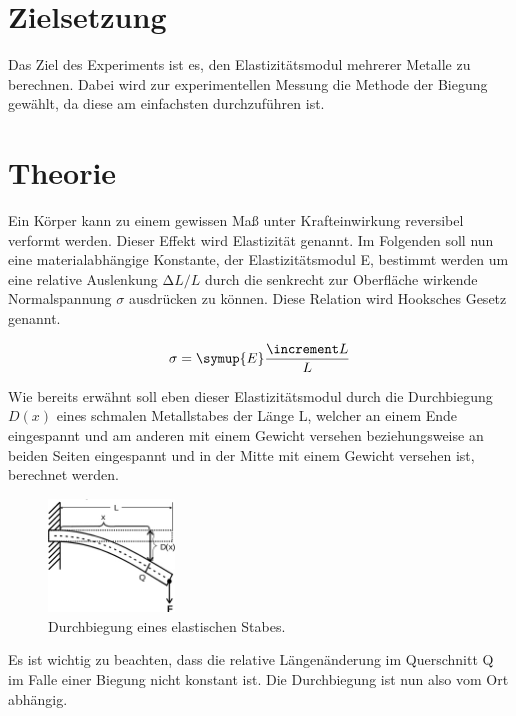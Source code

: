 \section{Zielsetzung}
\label{sec:Zielsetzung}

Das Ziel des Experiments ist es, den Elastizitätsmodul mehrerer Metalle zu berechnen.
Dabei wird zur experimentellen Messung die Methode der Biegung gewählt, da diese am einfachsten durchzuführen ist.

\section{Theorie}
\label{sec:Theorie}

Ein Körper kann zu einem gewissen Maß unter Krafteinwirkung reversibel
verformt werden. Dieser Effekt wird Elastizität genannt. Im Folgenden soll nun
eine materialabhängige Konstante, der Elastizitätsmodul E, bestimmt werden
um eine relative Auslenkung $\increment L/L$ durch die senkrecht zur Oberfläche
wirkende Normalspannung $\sigma$ ausdrücken zu können. Diese Relation wird
Hooksches Gesetz genannt.

\begin{equation}
  \sigma = \symup{E}\frac{\increment L}{L}
  \label{eqn:hook}
\end{equation}

Wie bereits erwähnt soll eben dieser Elastizitätsmodul durch die
Durchbiegung $D(x)$ eines schmalen Metallstabes der Länge L, welcher an
einem Ende eingespannt und am anderen mit einem Gewicht versehen
beziehungsweise an beiden Seiten eingespannt und in der Mitte
mit einem Gewicht versehen ist, berechnet werden.
\begin{figure}
  \centering
  \includegraphics[width=0.3\textwidth]{content/images/Abbildung1.jpg}
  \caption{Durchbiegung eines elastischen Stabes.}
  \label{fig:abb1}
\end{figure}
Es ist wichtig zu beachten, dass die relative Längenänderung im Querschnitt
Q im Falle einer Biegung nicht konstant ist. Die Durchbiegung ist nun also
vom Ort abhängig.

